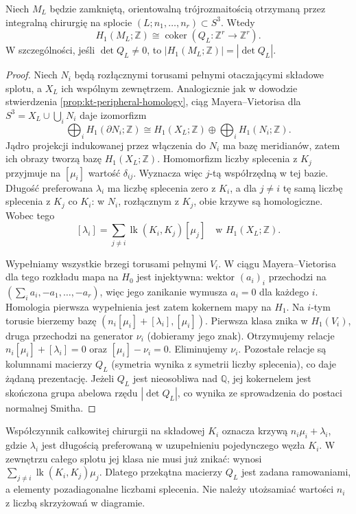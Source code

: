 \begin{twierdzenie}
Niech $M_L$ będzie zamkniętą, orientowalną trójrozmaitością
otrzymaną przez integralną chirurgię na splocie
$(L;n_1,\ldots,n_r)\subset S^3$. Wtedy
\[
H_1(M_L;\mathbb Z)\cong\operatorname{coker}
(Q_L:\mathbb Z^r\longrightarrow\mathbb Z^r).
\]
W szczególności, jeśli $\det Q_L\ne0$, to
$|H_1(M_L;\mathbb Z)|=|\det Q_L|$.
\end{twierdzenie}

\begin{proof}
Niech $N_i$ będą rozłącznymi torusami pełnymi
otaczającymi składowe splotu, a $X_L$ ich wspólnym
zewnętrzem. Analogicznie jak w dowodzie stwierdzenia
\ref{prop:kt-peripheral-homology}, ciąg Mayera--Vietorisa
dla $S^3=X_L\cup\bigcup_i N_i$ daje izomorfizm
\[
\bigoplus_i H_1(\partial N_i;\mathbb Z)
\cong H_1(X_L;\mathbb Z)\oplus
\bigoplus_i H_1(N_i;\mathbb Z).
\]
Jądro projekcji indukowanej przez włączenia do $N_i$
ma bazę meridianów, zatem ich obrazy tworzą bazę
$H_1(X_L;\mathbb Z)$. Homomorfizm liczby splecenia
z $K_j$ przyjmuje na $[\mu_i]$ wartość $\delta_{ij}$.
Wyznacza więc $j$-tą współrzędną w tej bazie.
Długość preferowana $\lambda_i$ ma liczbę splecenia
zero z $K_i$, a dla $j\ne i$ tę samą liczbę splecenia
z $K_j$ co $K_i$: w $N_i$, rozłącznym z $K_j$,
obie krzywe są homologiczne. Wobec tego
\[
[\lambda_i]=\sum_{j\ne i}
\operatorname{lk}(K_i,K_j)[\mu_j]\quad\text{w }H_1(X_L;\mathbb Z).
\]

Wypełniamy wszystkie brzegi torusami pełnymi $V_i$.
W ciągu Mayera--Vietorisa dla tego rozkładu mapa
na $H_0$ jest injektywna: wektor $(a_i)_i$ przechodzi
na $(\sum_i a_i,-a_1,\ldots,-a_r)$, więc jego
zanikanie wymusza $a_i=0$ dla każdego $i$.
Homologia pierwsza wypełnienia jest zatem kokernem
mapy na $H_1$. Na $i$-tym torusie bierzemy bazę
$(n_i[\mu_i]+[\lambda_i],[\mu_i])$.
Pierwsza klasa znika w $H_1(V_i)$, druga
przechodzi na generator $\nu_i$ (dobieramy jego znak).
Otrzymujemy relacje $n_i[\mu_i]+[\lambda_i]=0$
oraz $[\mu_i]-\nu_i=0$. Eliminujemy $\nu_i$.
Pozostałe relacje są kolumnami macierzy $Q_L$
(symetria wynika z symetrii liczby splecenia),
co daje żądaną prezentację.
Jeżeli $Q_L$ jest nieosobliwa nad $\mathbb Q$, jej
kokernelem jest skończona grupa abelowa rzędu
$|\det Q_L|$, co wynika ze sprowadzenia do postaci
normalnej Smitha.
\end{proof}

\begin{uwaga}
Współczynnik całkowitej chirurgii na składowej $K_i$
oznacza krzywą $n_i\mu_i+\lambda_i$, gdzie $\lambda_i$
jest długością preferowaną w uzupełnieniu pojedynczego węzła
$K_i$. W zewnętrzu całego splotu jej klasa nie musi już
znikać: wynosi $\sum_{j\ne i}\operatorname{lk}(K_i,K_j)\mu_j$.
Dlatego przekątna macierzy $Q_L$ jest zadana ramowaniami,
a elementy pozadiagonalne liczbami splecenia. Nie należy
utożsamiać wartości $n_i$ z liczbą skrzyżowań w diagramie.
\end{uwaga}


